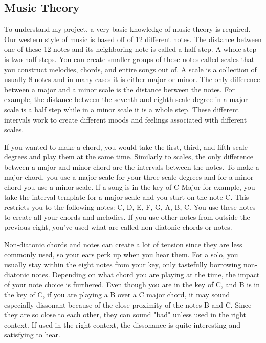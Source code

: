 \documentclass[10pt,twocolumn]{article}
\begin{document}
    \subsection{Music Theory}
        To understand my project, a very basic knowledge of music theory is required. Our western style of music is based off of 12 different notes. The distance between one of these 12 notes and its neighboring note is called a half step. A whole step is two half steps. You can create smaller groups of these notes called scales that you construct melodies, chords, and entire songs out of. A scale is a collection of usually 8 notes and in many cases it is either major or minor. The only difference between a major and a minor scale is the distance between the notes. For example, the distance between the seventh and eighth scale degree in a major scale is a half step while in a minor scale it is a whole step. These different intervals work to create different moods and feelings associated with different scales.\newline 
        
        If you wanted to make a chord, you would take the first, third, and fifth scale degrees and play them at the same time. Similarly to scales, the only difference between a major and minor chord are the intervals between the notes. To make a major chord, you use a major scale for your three scale degrees and for a minor chord you use a minor scale. If a song is in the key of C Major for example, you take the interval template for a major scale and you start on the note C. This restricts you to the following notes: C, D, E, F, G, A, B, C. You use these notes to create all your chords and melodies. If you use other notes from outside the previous eight, you've used what are called non-diatonic chords or notes. \newline
        
        Non-diatonic chords and notes can create a lot of tension since they are less commonly used, so your ears perk up when you hear them. For a solo, you usually stay within the eight notes from your key, only tastefully borrowing non-diatonic notes. Depending on what chord you are playing at the time, the impact of your note choice is furthered. Even though you are in the key of C, and B is in the key of C, if you are playing a B over a C major chord, it may sound especially dissonant because of the close proximity of the notes B and C. Since they are so close to each other, they can sound "bad" unless used in the right context. If used in the right context, the dissonance is quite interesting and satisfying to hear. \newline
        
\end{document}
